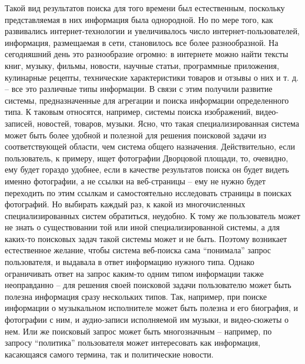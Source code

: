 \documentclass[12pt,a4paper]{report}
\newcommand\note[1]{\textcolor{red}{(#1)}}
\begin{document}
Такой вид результатов поиска для того времени был естественным, поскольку представляемая в них информация была однородной. 
Но по мере того, как развивались интернет-технологии и увеличивалось число интернет-пользователей, информация, размещаемая в сети, становилось все более разнообразной. На сегодняшний день это разнообразие огромно: в интернете можно найти тексты книг, музыку, фильмы, новости, научные статьи, программные приложения, кулинарные рецепты, технические характеристики товаров и отзывы о них и т. д. -- все это различные типы информации. В связи с этим получили развитие системы, предназначенные для агрегации и поиска информации определенного типа. К таковым относятся, например, системы поиска изображений, видео-записей, новостей, товаров, музыки. Ясно, что такая специализированная система может быть более удобной и полезной для решения поисковой задачи из соответствующей области, чем система общего назначения. 
Действительно, если пользователь, к примеру, ищет фотографии Дворцовой площади, то, очевидно, ему будет гораздо удобнее, если в качестве результатов поиска он будет видеть именно фотографии, а не ссылки на веб-страницы -- ему не нужно будет переходить по этим ссылкам и самостоятельно исследовать страницы в поисках фотографий.
Но выбирать каждый раз, к какой из многочисленных специализированных систем обратиться, неудобно. К тому же пользователь может не знать о существовании той или иной специализированной системы, а для каких-то поисковых задач такой системы может и не быть. Поэтому возникает естественное желание, чтобы система веб-поиска сама ``понимала'' запрос пользователя, и выдавала в ответ информацию нужного типа. Однако ограничивать ответ на запрос каким-то одним типом информации также неоправданно -- для решения своей поисковой задачи пользователю может быть полезна информация сразу нескольких типов. Так, например, при поиске информации о музыкальном исполнителе может быть полезна и его биография, и фотографии с ним, и аудио-записи исполняемой им музыки, и видео-сюжеты о нем. Или же поисковый запрос может быть многозначным -- например, по запросу ``политика'' пользователя может интересовать как информация, касающаяся самого термина, так и политические новости. 
\end{document}
